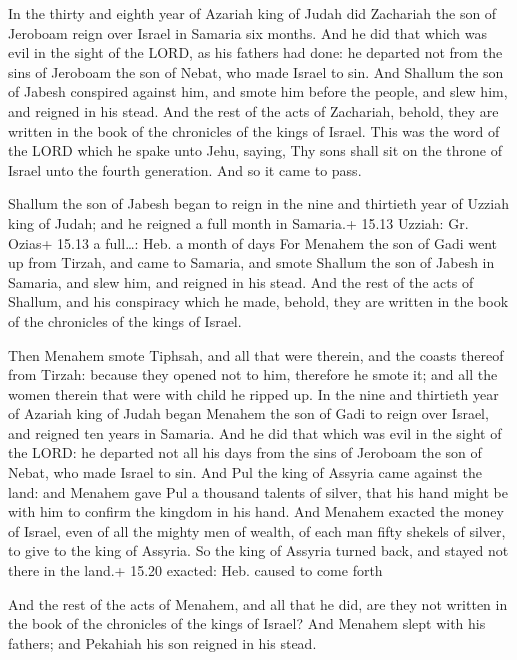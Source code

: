  In the thirty and eighth year of Azariah king of Judah
did Zachariah the son of Jeroboam reign over Israel in Samaria six
months.  And he did that which was evil in the sight of the
LORD, as his fathers had done: he departed not from the sins of Jeroboam
the son of Nebat, who made Israel to sin.  And Shallum the
son of Jabesh conspired against him, and smote him before the people,
and slew him, and reigned in his stead.  And the rest of
the acts of Zachariah, behold, they are written in the book of the
chronicles of the kings of Israel.  This was the word of
the LORD which he spake unto Jehu, saying, Thy sons shall sit on the
throne of Israel unto the fourth generation. And so it came to pass.

 Shallum the son of Jabesh began to reign in the nine and
thirtieth year of Uzziah king of Judah; and he reigned a full month in
Samaria.+ 15.13 Uzziah: Gr. Ozias+ 15.13 a full\ldots: Heb. a month of
days  For Menahem the son of Gadi went up from Tirzah, and
came to Samaria, and smote Shallum the son of Jabesh in Samaria, and
slew him, and reigned in his stead.  And the rest of the
acts of Shallum, and his conspiracy which he made, behold, they are
written in the book of the chronicles of the kings of Israel.

 Then Menahem smote Tiphsah, and all that were therein,
and the coasts thereof from Tirzah: because they opened not to him,
therefore he smote it; and all the women therein that were with child he
ripped up.  In the nine and thirtieth year of Azariah king
of Judah began Menahem the son of Gadi to reign over Israel, and reigned
ten years in Samaria.  And he did that which was evil in
the sight of the LORD: he departed not all his days from the sins of
Jeroboam the son of Nebat, who made Israel to sin.  And Pul
the king of Assyria came against the land: and Menahem gave Pul a
thousand talents of silver, that his hand might be with him to confirm
the kingdom in his hand.  And Menahem exacted the money of
Israel, even of all the mighty men of wealth, of each man fifty shekels
of silver, to give to the king of Assyria. So the king of Assyria turned
back, and stayed not there in the land.+ 15.20 exacted: Heb. caused to
come forth

 And the rest of the acts of Menahem, and all that he
did, are they not written in the book of the chronicles of the kings of
Israel?  And Menahem slept with his fathers; and Pekahiah
his son reigned in his stead.


